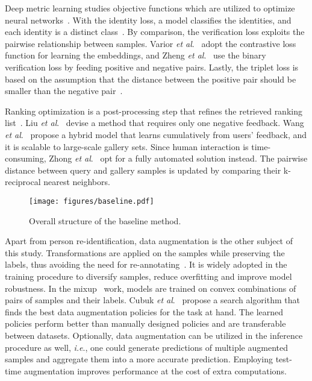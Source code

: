 \documentclass{article}
\def\onedot{.}
\def\ie{\emph{i.e}\onedot} \def\Ie{\emph{I.e}\onedot}
\def\etal{\emph{et al}\onedot}
\begin{document}
Deep metric learning studies objective functions which are utilized to optimize neural networks~\cite{ye2020deep}.
With the identity loss, a model classifies the identities, and each identity is a distinct class~\cite{zheng2017person,luo2019bag}.
By comparison, the verification loss exploits the pairwise relationship between samples.
Varior \etal~\cite{varior2016siamese} adopt the contrastive loss function for learning the embeddings, and Zheng \etal~\cite{zheng2017discriminatively} use the binary verification loss by feeding positive and negative pairs.
Lastly, the triplet loss is based on the assumption that the distance between the positive pair should be smaller than the negative pair~\cite{hermans2017defense}.

Ranking optimization is a post-processing step that refines the retrieved ranking list~\cite{ye2020deep}.
Liu \etal~\cite{liu2013pop} devise a method that requires only one negative feedback.
Wang \etal~\cite{wang2016human} propose a hybrid model that learns cumulatively from users' feedback, and it is scalable to large-scale gallery sets.
Since human interaction is time-consuming, Zhong \etal~\cite{zhong2017re} opt for a fully automated solution instead.
The pairwise distance between query and gallery samples is updated by comparing their k-reciprocal nearest neighbors.

\begin{figure}[t]
\begin{center}
\texttt{[image: figures/baseline.pdf]}
\end{center}
\caption{
Overall structure of the baseline method.
}
\label{figure:baseline}
\end{figure}

Apart from person re-identification, data augmentation is the other subject of this study.
Transformations are applied on the samples while preserving the labels, thus avoiding the need for re-annotating~\cite{shorten2019survey}.
It is widely adopted in the training procedure to diversify samples, reduce overfitting and improve model robustness.
In the mixup~\cite{zhang2017mixup} work, models are trained on convex combinations of pairs of samples and their labels.
Cubuk \etal~\cite{cubuk2018autoaugment} propose a search algorithm that finds the best data augmentation policies for the task at hand.
The learned policies perform better than manually designed policies and are transferable between datasets.
Optionally, data augmentation can be utilized in the inference procedure as well, \ie, one could generate predictions of multiple augmented samples and aggregate them into a more accurate prediction.
Employing test-time augmentation improves performance at the cost of extra computations.
\end{document}
